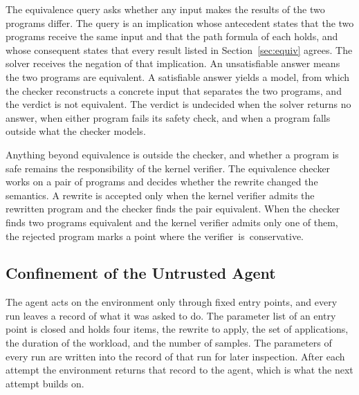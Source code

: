 The equivalence query asks whether any input makes the results of the two programs differ.
The query is an implication whose antecedent states that the two programs receive the same input and that the path formula of each holds, and whose consequent states that every result listed in Section~\ref{sec:equiv} agrees.
The solver receives the negation of that implication.
An unsatisfiable answer means the two programs are equivalent.
A satisfiable answer yields a model, from which the checker reconstructs a concrete input that separates the two programs, and the verdict is not equivalent.
The verdict is undecided when the solver returns no answer, when either program fails its safety check, and when a program falls outside what the checker models.

Anything beyond equivalence is outside the checker, and whether a program is safe remains the responsibility of the kernel verifier.
The equivalence checker works on a pair of programs and decides whether the rewrite changed the semantics.
A rewrite is accepted only when the kernel verifier admits the rewritten program and the checker finds the pair equivalent.
When the checker finds two programs equivalent and the kernel verifier admits only one of them, the rejected program marks a point where the verifier~is~conservative.

\subsection{Confinement of the Untrusted Agent}\label{sec:agent}

The agent acts on the environment only through fixed entry points, and every run leaves a record of what it was asked to do.
The parameter list of an entry point is closed and holds four items, the rewrite to apply, the set of applications, the duration of the workload, and the number of samples.
The parameters of every run are written into the record of that run for later inspection.
After each attempt the environment returns that record to the agent, which is what the next attempt builds on.

